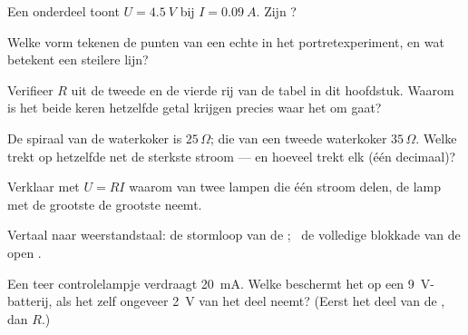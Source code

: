 \begin{exercise}[$\star$]\label{exo:g8:ohms-law:3}
Een onderdeel toont $U = \qty{4.5}{V}$ bij $I = \qty{0.09}{A}$. Zijn
?
\end{exercise}

\begin{exercise}[$\star$]\label{exo:g8:ohms-law:4}
Welke vorm tekenen de punten van een echte  in het
portretexperiment, en wat betekent een steilere lijn?
\end{exercise}

\begin{exercise}[$\star$]\label{exo:g8:ohms-law:5}
Verifieer $R$ uit de tweede en de vierde rij van de tabel in dit
hoofdstuk. Waarom is het beide keren hetzelfde getal krijgen precies
waar het om gaat?
\end{exercise}

\begin{exercise}[$\star$]\label{exo:g8:ohms-law:6}
De spiraal van de waterkoker is $25\,\Omega$; die van een tweede
waterkoker $35\,\Omega$. Welke trekt op hetzelfde net de sterkste
stroom --- en hoeveel trekt elk (één decimaal)?
\end{exercise}

\begin{exercise}[$\star$]\label{exo:g8:ohms-law:7}
Verklaar met $U = R I$ waarom van twee lampen  die één stroom
delen, de lamp met de grootste  de grootste
 neemt.
\end{exercise}

\begin{exercise}[$\star$]\label{exo:g8:ohms-law:8}
Vertaal naar weerstandstaal: de stormloop van de
; \ de volledige blokkade van de open
.
\end{exercise}

\begin{exercise}[$\star\star$]\label{exo:g8:ohms-law:9}
Een teer controlelampje verdraagt \qty{20}{mA}. Welke
  beschermt het op een
\qty{9}{V}-batterij, als het  zelf ongeveer \qty{2}{V}
van het deel neemt? (Eerst het deel van de
, dan $R$.)
\end{exercise}

